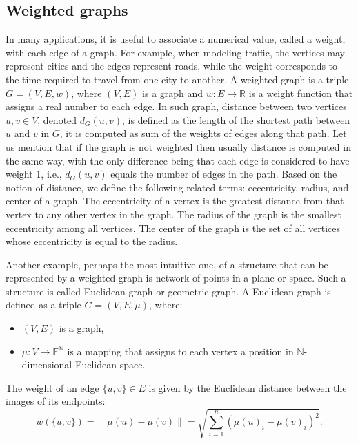 \documentclass[12pt]{article}
\begin{document}
	\subsection{Weighted graphs}	
		In many applications, it is useful to associate a numerical value, called a weight, with each edge of a graph. For example, when modeling traffic, the vertices may represent cities and the edges represent roads, while the weight corresponds to the time required to travel from one city to another. 
		A weighted graph is a triple \( G = (V, E, w) \), where \( (V, E) \) is a graph and \( w : E \to \mathbb{R} \) is a weight function that assigns a real number to each edge. 
		In such graph, distance between two vertices \( u, v \in V \), denoted \( d_G(u,v) \),  is defined as the length of the shortest path between \( u \) and \( v \) in \( G \), it is computed as sum of the weights of edges along that path. Let us mention that if the graph is not weighted then usually distance is computed in the same way, with the only difference being that each edge is considered to have weight 1, i.e., \( d_G(u,v) \) equals the number of edges in the path.
		Based on the notion of distance, we define the following related terms: eccentricity, radius, and center of a graph. The eccentricity of a vertex is the greatest distance from that vertex to any other vertex in the graph. The radius of the graph is the smallest eccentricity among all vertices. The center of the graph is the set of all vertices whose eccentricity is equal to the radius.
		
		Another example, perhaps the most intuitive one, of a structure that can be represented by a weighted graph is network of points in a plane or space. Such a structure is called Euclidean graph or geometric graph.
		A Euclidean graph is defined as a triple \( G = (V, E, \mu) \), where:
		\begin{itemize}
			\item \( (V, E) \) is a graph,
			\item \( \mu : V \to \mathbb{E}^\mathbb{N} \) is a mapping that assigns to each vertex a position in \(\mathbb{N}\)-dimensional Euclidean space.
		\end{itemize}
		The weight of an edge \( \{u,v\} \in E \) is given by the Euclidean distance between the images of its endpoints:
		\[
		w(\{u,v\}) = \| \mu(u) - \mu(v) \| = \sqrt{ \sum_{i=1}^{n} (\mu(u)_i - \mu(v)_i)^2 }.
		\]
		
		
\end{document}
